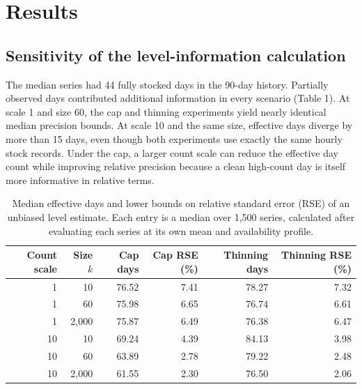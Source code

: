 \documentclass[11pt,a4paper]{article}
\begin{document}
\section{Results}

\subsection{Sensitivity of the level-information calculation}

The median series had 44 fully stocked days in the 90-day history. Partially observed days contributed additional information in every scenario (Table 1). At scale 1 and size 60, the cap and thinning experiments yield nearly identical median precision bounds. At scale 10 and the same size, effective days diverge by more than 15 days, even though both experiments use exactly the same hourly stock records. Under the cap, a larger count scale can reduce the effective day count while improving relative precision because a clean high-count day is itself more informative in relative terms.

\begin{table}[htbp]\centering\small
\caption{Median effective days and lower bounds on relative standard error (RSE) of an unbiased level estimate. Each entry is a median over 1,500 series, calculated after evaluating each series at its own mean and availability profile.}
\label{tab:info}


\begin{tabular}{@{}rrrrrr@{}}\toprule

Count scale & Size \(k\) & Cap days & Cap RSE (\%) & Thinning days & Thinning RSE (\%) \\

\midrule

1 & 10 & 76.52 & 7.41 & 78.27 & 7.32 \\

1 & 60 & 75.98 & 6.65 & 76.74 & 6.61 \\

1 & 2,000 & 75.87 & 6.49 & 76.38 & 6.47 \\

10 & 10 & 69.24 & 4.39 & 84.13 & 3.98 \\

10 & 60 & 63.89 & 2.78 & 79.22 & 2.48 \\

10 & 2,000 & 61.55 & 2.30 & 76.50 & 2.06 \\

\bottomrule\end{tabular}\end{table}
\end{document}

